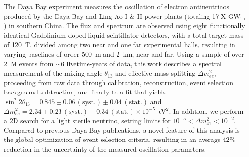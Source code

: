 The Daya Bay experiment measures the oscillation of electron antineutrinos produced by the Daya Bay and Ling Ao-I \& II power plants (totaling 17.X GW$_\mathrm{th}$) in southern China. The flux and spectrum are observed using eight functionally identical Gadolinium-doped liquid scintillator detectors, with a total target mass of 120~T, divided among two near and one far experimental halls, resulting in varying baselines of order 500~m and 2~km, near and far. Using a sample of over 2~M events from $\sim$6 livetime-years of data, this work describes a spectral measurement of the mixing angle $\theta_{13}$ and effective mass splitting $\Delta m^2_{ee}$, proceeding from raw data through calibration, reconstruction, event selection, background subtraction, and finally to a fit that yields $\sin^2 2\theta_{13} = 0.845 \pm 0.06\,\mathrm{(syst.)} \pm 0.04\,\mathrm{(stat.)}$ and $\Delta m^2_{ee} = 2.34 \pm 0.23\,\mathrm{(syst.)} \pm 0.34\,\mathrm{(stat.)} \times 10^{-5}$~eV$^2$. In addition, we perform a 2D search for a light sterile neutrino, setting limits for $10^{-5} < \Delta m^2_{41} < 10^{-2}$. Compared to previous Daya Bay publications, a novel feature of this analysis is the global optimization of event selection criteria, resulting in an average 42$\%$ reduction in the uncertainty of the measured oscillation parameters.